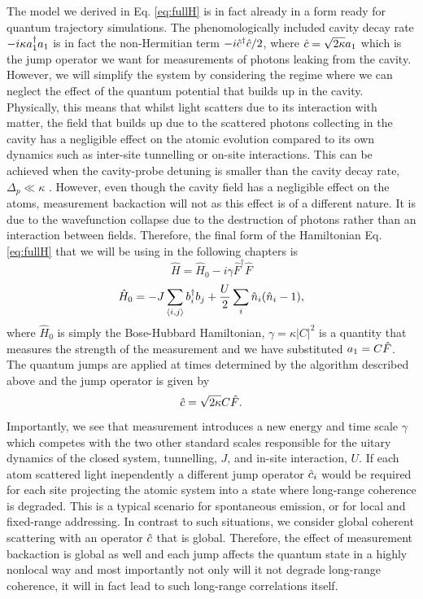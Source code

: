 The model we derived in Eq. \eqref{eq:fullH} is in fact already in a
form ready for quantum trajectory simulations. The phenomologically
included cavity decay rate $-i \kappa a^\dagger_1 a_1$ is in fact the
non-Hermitian term $-i \hat{c}^\dagger \hat{c} / 2$, where $\hat{c} = \sqrt{2 \kappa} a_1$
which is the jump operator we want for measurements of photons leaking
from the cavity. However, we will simplify the system by considering
the regime where we can neglect the effect of the quantum potential
that builds up in the cavity. Physically, this means that whilst light
scatters due to its interaction with matter, the field that builds up
due to the scattered photons collecting in the cavity has a negligible
effect on the atomic evolution compared to its own dynamics such as
inter-site tunnelling or on-site interactions. This can be achieved
when the cavity-probe detuning is smaller than the cavity decay rate,
$\Delta_p \ll \kappa$ \cite{caballero2015}. However, even though the
cavity field has a negligible effect on the atoms, measurement
backaction will not as this effect is of a different nature. It is due
to the wavefunction collapse due to the destruction of photons rather
than an interaction between fields. Therefore, the final form of the
Hamiltonian Eq. \eqref{eq:fullH} that we will be using in the
following chapters is
\begin{equation}
  \hat{H} = \hat{H}_0 - i \gamma \hat{F}^\dagger \hat{F}
\end{equation}
\begin{equation}
  \hat{H}_0 = -J \sum_{\langle i, j \rangle} b^\dagger_i b_j + \frac{U}{2}
                \sum_i \hat{n}_i (\hat{n}_i - 1),
\end{equation}
where $\hat{H}_0$ is simply the Bose-Hubbard Hamiltonian,
$\gamma = \kappa |C|^2$ is a quantity that measures the strength of
the measurement and we have substituted $a_1 = C \hat{F}$. The
quantum jumps are applied at times determined by the algorithm
described above and the jump operator is given by
\begin{equation}
  \label{eq:jump}
  \hat{c} = \sqrt{2 \kappa} C \hat{F}.
\end{equation}
Importantly, we see that measurement introduces a new energy and time
scale $\gamma$ which competes with the two other standard scales
responsible for the uitary dynamics of the closed system, tunnelling,
$J$, and in-site interaction, $U$.  If each atom scattered light
inependently a different jump operator $\hat{c}_i$ would be required for
each site projecting the atomic system into a state where long-range
coherence is degraded. This is a typical scenario for spontaneous
emission, or for local and fixed-range addressing. In contrast to such
situations, we consider global coherent scattering with an operator
$\hat{c}$ that is global. Therefore, the effect of measurement backaction
is global as well and each jump affects the quantum state in a highly
nonlocal way and most importantly not only will it not degrade
long-range coherence, it will in fact lead to such long-range
correlations itself.

